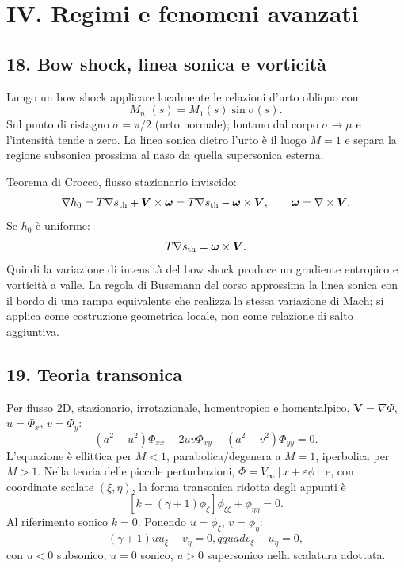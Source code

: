 \documentclass[11pt,a4paper]{article}
\begin{document}
\section*{IV. Regimi e fenomeni avanzati}

\subsection*{18. Bow shock, linea sonica e vorticità}

Lungo un bow shock applicare localmente le relazioni d'urto obliquo con
\[
M_{n1}(s)=M_1(s)\sin\sigma(s).
\]
Sul punto di ristagno $\sigma=\pi/2$ (urto normale); lontano dal corpo
$\sigma\to\mu$ e l'intensità tende a zero. La linea sonica dietro l'urto è il luogo
$M=1$ e separa la regione subsonica prossima al naso da quella supersonica esterna.

Teorema di Crocco, flusso stazionario inviscido:
\[
\nabla h_0=T\nabla s_{\rm th}+\boldsymbol V\times\boldsymbol\omega
=T\nabla s_{\rm th}-\boldsymbol\omega\times\boldsymbol V,
\qquad \boldsymbol\omega=\nabla\times\boldsymbol V.
\]
Se $h_0$ è uniforme:
\[
T\nabla s_{\rm th}=\boldsymbol\omega\times\boldsymbol V.
\]
Quindi la variazione di intensità del bow shock produce un gradiente entropico e
vorticità a valle. La regola di Busemann del corso approssima la linea sonica con il
bordo di una rampa equivalente che realizza la stessa variazione di Mach; si applica
come costruzione geometrica locale, non come relazione di salto aggiuntiva.


\subsection*{19. Teoria transonica}

Per flusso 2D, stazionario, irrotazionale, homentropico e homentalpico,
$\boldsymbol V=\nabla\Phi$, $u=\Phi_x$, $v=\Phi_y$:
\[
(a^2-u^2)\Phi_{xx}-2uv\Phi_{xy}+(a^2-v^2)\Phi_{yy}=0.
\]
L'equazione è ellittica per $M<1$, parabolica/degenera a $M=1$, iperbolica per $M>1$.
Nella teoria delle piccole perturbazioni, $\Phi=V_\infty[x+\varepsilon\phi]$ e, con
coordinate scalate $(\xi,\eta)$, la forma transonica ridotta degli appunti è
\[
[k-(\gamma+1)\phi_\xi]\phi_{\xi\xi}+\phi_{\eta\eta}=0.
\]
Al riferimento sonico $k=0$. Ponendo $u=\phi_\xi$, $v=\phi_\eta$:
\[
(\gamma+1)u u_\xi-v_\eta=0,qquad v_\xi-u_\eta=0,
\]
con $u<0$ subsonico, $u=0$ sonico, $u>0$ supersonico nella scalatura adottata.
\end{document}
